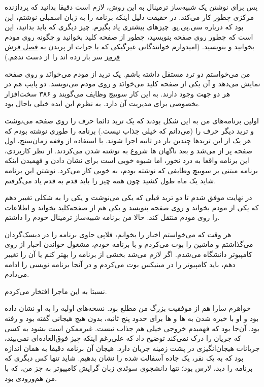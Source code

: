 پس برای نوشتن یک شبیه‌ساز ترمینال به این روش، لازم است دقیقا بدانید که
پردازنده مرکزی چطور کار می‌کند. در حقیقت دلیل اینکه برنامه را به زبان
اسمبلی نوشتم، این بود که درباره سی.پی.یو. چیزهای بیشتری یاد بگیرم. چیز
دیگری که باید بدانید، این است که چطور روی صفحه بنویسید، چطور از صفحه
کلید بخوانید و چگونه روی مودم بخوانید و بنویسید. (امیدوارم خوانندگانی
غیرگیکی که با جرات از پریدن به \hyperref[ch4]{فصل فرش قرمز} سر باز زده
اند را از دست ندهم.)

من می‌خواستم دو ترد مستقل داشته باشم. یک ترید از مودم
می‌خوانَد و روی صفحه نمایش می‌دهد و آن یکی از صفحه کلید می‌خوانَد و روی
مودم می‌نویسد. دو پایپ هم در هر دو جهت وجود دارند. به
این کار سوییچ وظایف می‌گویند و ۳۸۶ سخت‌افزار
بخصوصی برای مدیریت آن دارد. به نظرم این ایده خیلی باحال بود.

اولین برنامه‌های من به این شکل بودند که یک ترید دائما حرف  را
روی صفحه می‌نوشت و ترید دیگر حرف  را (می‌دانم که خیلی جذاب نیست.)
برنامه‌ را طوری نوشته بودم که هر یک از این تریدها چندین بار در ثانیه
اجرا شوند. با استفاده از وقفه زمان‌سنج، اول صفحه پر از 
می‌شد و بعد ناگهان  ها شروع به نوشته شدن می‌کردند. از نظر
کاربردی، این برنامه واقعا به درد نخور، اما شیوه خوبی است برای نشان
دادن و فهمیدن اینکه برنامه مبتنی بر سوییچ وظایفی که نوشته بودم، به
خوبی کار می‌کرد. نوشتن این برنامه شاید یک ماه طول کشید چون همه چیز را
باید قدم به قدم یاد می‌گرفتم.

در نهایت موفق شدم تا دو ترید قبلی که یکی  می‌نوشت و یکی
 را به شکلی تغییر دهم که یکی از مودم بخواند و روی صفحه
بنویسد و یکی هم از صفحه‌کلید بخواند و اطلاعات را روی مودم منتقل
کند. حالا من برنامه شبیه‌ساز ترمینال خودم را داشتم.

هر وقت که می‌خواستم اخبار را بخوانم، فلاپی حاوی برنامه را در دیسک‌گردان
می‌گذاشتم و ماشین را بوت می‌کردم و با برنامه خودم، مشغول خواندن اخبار از
روی کامپیوتر دانشگاه می‌شدم. اگر لازم می‌شد بخشی از برنامه را بهتر کنم
یا آن را تغییر دهم،‌ باید کامپیوتر را در مینیکس بوت می‌کردم و در آنجا
برنامه نویسی را ادامه می‌دادم.

نسبتا به این ماجرا افتخار می‌کردم. 

خواهرم سارا هم از موفقیت‌ بزرگ من مطلع بود. نسخه‌های اولیه را به او نشان
داده بود و او با خیره شدن به  ها و  ها برای
حدود پنج ثانیه، بدون هیچ هیجانی گفته بود  و رفته
بود. آن‌جا بود که فهمیدم خروجی خیلی هم جذاب نیست. غیرممکن است بشود به
کسی که جریان را درک نمی‌کند توضیح داد که علی‌رغم اینکه چیز فوق‌العاده‌ای
نمی‌بیند، جریانات هیجان‌انگیزی در پشت زمینه جریان دارد. هیجان آن برنامه
دقیقا به همان اندازه بود که به یک نفر، یک جاده آسفالت شده را نشان
بدهیم. شاید تنها کس دیگری که برنامه را دید، لارس بود؛
تنها دانشجوی سوئدی زبان گرایش کامپیوتر به جز من، که با من هم‌ورودی بود.


